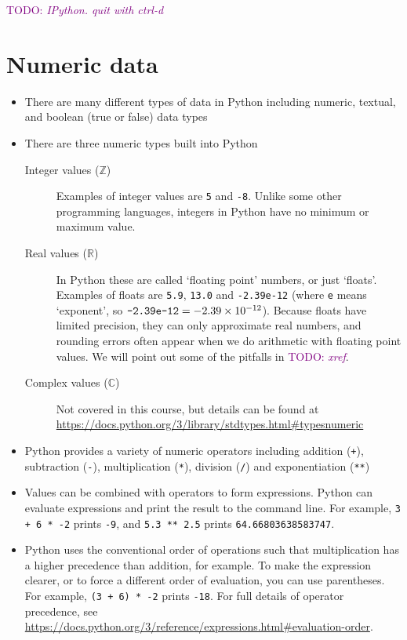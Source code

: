 \documentclass[a4paper,twoside]{memoir}
\newcommand{\shellcmd}{\texttt}
\newcommand{\TODO}[1]{\textcolor{purple}{TODO: \emph{#1}}}
\begin{document}
\TODO{IPython.  quit with ctrl-d}

\section{Numeric data}
\begin{itemize}
\item There are many different types of data in Python including numeric, textual, and boolean (true or false) data types
\item There are three numeric types built into Python
	\begin{description}
	\item[Integer values ($\mathbb{Z}$)]{Examples of integer values are \shellcmd{5} and \shellcmd{-8}.  Unlike some other programming languages, integers in Python have no minimum or maximum value.}
	\item[Real values ($\mathbb{R}$)]{In Python these are called `floating point' numbers, or just `floats'.  Examples of floats are \shellcmd{5.9}, \shellcmd{13.0} and \shellcmd{-2.39e-12} (where \shellcmd{e} means `exponent', so $\text{\shellcmd{-2.39e-12}} = \num{-2.39e-12}$).  Because floats have limited precision, they can only approximate real numbers, and rounding errors often appear when we do arithmetic with floating point values.  We will point out some of the pitfalls in \TODO{xref}.}
	\item[Complex values ($\mathbb{C}$)]{Not covered in this course, but details can be found at \url{https://docs.python.org/3/library/stdtypes.html#typesnumeric}}
	\end{description}
\item Python provides a variety of numeric operators including addition (\shellcmd{+}), subtraction (\shellcmd{-}), multiplication (\shellcmd{*}), division (\shellcmd{/}) and exponentiation (\shellcmd{**})
\item Values can be combined with operators to form expressions.  Python can evaluate expressions and print the result to the command line.  For example, \shellcmd{3 + 6 * -2} prints \shellcmd{-9}, and \shellcmd{5.3 ** 2.5} prints \shellcmd{64.66803638583747}.
\item Python uses the conventional order of operations such that multiplication has a higher precedence than addition, for example.  To make the expression clearer, or to force a different order of evaluation, you can use parentheses.  For example, \shellcmd{(3 + 6) * -2} prints \shellcmd{-18}.  For full details of operator precedence, see \url{https://docs.python.org/3/reference/expressions.html#evaluation-order}.
\end{itemize}
\end{document}

